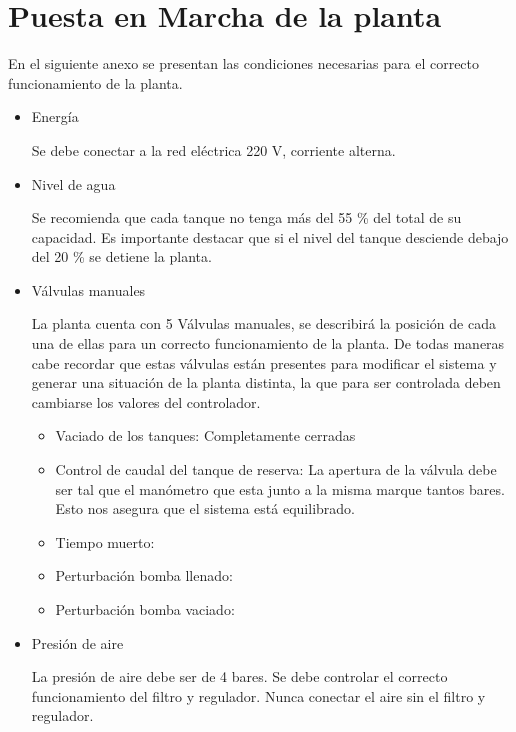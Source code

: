 \section{Puesta en Marcha de la planta}
\label{anexo:puestaEnMarcha}

En el siguiente anexo se presentan las condiciones necesarias para el
correcto funcionamiento de la planta.

\begin{itemize}
 \item Energía
 
 Se debe conectar a la red eléctrica 220 V, corriente alterna.
 
 \item Nivel de agua
 
 Se recomienda que cada tanque no tenga más del 55 \% del total de su 
 capacidad. Es importante destacar que si el nivel del tanque desciende
 debajo del 20 \% se detiene la planta. 
 
 \item Válvulas manuales
 
 La planta cuenta con 5 Válvulas manuales, se describirá la posición de 
 cada una de ellas para un correcto funcionamiento de la planta. De todas
 maneras cabe recordar que estas válvulas están presentes para modificar el 
 sistema y generar una situación de la planta distinta, la que para ser 
 controlada deben cambiarse los valores del controlador.
 
 \begin{itemize}
  \item Vaciado de los tanques: Completamente cerradas
  \item Control de caudal del tanque de reserva:
  La apertura de la válvula debe ser tal que el manómetro que esta junto
  a la misma marque tantos bares. Esto nos asegura que el sistema está 
  equilibrado.
  \item Tiempo muerto:
  \item Perturbación bomba llenado:
  \item Perturbación bomba vaciado:
 \end{itemize}

 \item Presión de aire
 
 La presión de aire debe ser de 4 bares. Se debe controlar el correcto 
 funcionamiento del filtro y regulador. Nunca conectar el aire sin el filtro y 
 regulador.
 
 \end{itemize}

